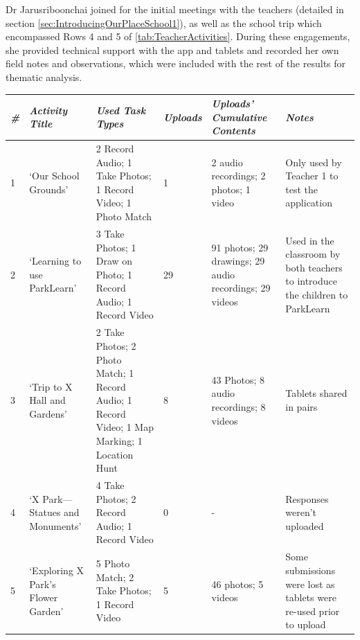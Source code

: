 Dr Jarusriboonchai joined for the initial meetings with the teachers (detailed in section \ref{sec:IntroducingOurPlaceSchool1}), as well as the school trip which encompassed Rows 4 and 5 of \ref{tab:TeacherActivities}. During these engagements, she provided technical support with the app and tablets and recorded her own field notes and observations, which were included with the rest of the results for thematic analysis.   

\begin{table}[]
    \centering
    \begin{tabularx}{\linewidth}{ 
| p{4mm} 
| >{\raggedright\arraybackslash}X 
| >{\raggedright\arraybackslash}X 
| p{13mm}
| >{\raggedright\arraybackslash}X 
| >{\raggedright\arraybackslash}X 
|}
\hline
\small\textit{\#}
    & \small\textit{Activity Title} 
    & \small\textit{Used Task Types}
    & \small\textit{Uploads}
    & \small\textit{Uploads' Cumulative Contents}
    & \small\textit{Notes}\\
\hline
\small 1 
    & \footnotesize `Our School Grounds' 
    & \footnotesize 2 Record Audio; 1 Take Photos; 1 Record Video; 1 Photo Match 
    & \footnotesize 1  
    & \footnotesize 2 audio recordings; 2 photos; 1 video
    & \footnotesize Only used by Teacher 1 to test the application\\
\hline
\small 2
    & \footnotesize `Learning to use ParkLearn' 
    & \footnotesize 3 Take Photos; 1 Draw on Photo; 1 Record Audio; 1 Record Video 
    & \footnotesize 29  
    & \footnotesize 91 photos; 29 drawings; 29 audio recordings; 29 videos
    & \footnotesize Used in the classroom by both teachers to introduce the children to ParkLearn\\
\hline
\small 3
    & \footnotesize `Trip to X Hall and Gardens' 
    & \footnotesize 2 Take Photos; 2 Photo Match; 1 Record Audio; 1 Record Video; 1 Map Marking; 1 Location Hunt 
    & \footnotesize 8  
    & \footnotesize 43 Photos; 8 audio recordings; 8 videos
    & \footnotesize Tablets shared in pairs\\
\hline
\small 4 
    & \footnotesize `X Park---Statues and Monuments' 
    & \footnotesize 4 Take Photos; 2 Record Audio; 1 Record Video
    & \footnotesize 0  
    & \footnotesize -
    & \footnotesize Responses weren't uploaded\\
\hline
    \small 5 
    & \footnotesize `Exploring X Park's Flower Garden' 
    & \footnotesize 5 Photo Match; 2 Take Photos; 1 Record Video
    & \footnotesize 5 
    & \footnotesize 46 photos; 5 videos
    & \footnotesize Some submissions were lost as tablets were re-used prior to upload\\

\end{tabularx}
\end{table}
